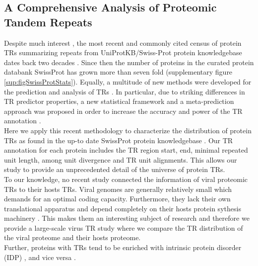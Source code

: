 \documentclass[a4,center,fleqn]{NAR}
\begin{document}
\subsection{A Comprehensive Analysis of Proteomic Tandem Repeats}
Despite much interest \cite{DiDomenico2013}, the most recent and commonly cited census of protein TRs summarizing repeats from UniProtKB/Swiss-Prot protein knowledgebase \cite{UniProt2017} dates back two decades \cite{Marcotte1999}. Since then the number of proteins in the curated protein databank SwissProt has grown more than seven fold (supplementary figure \ref{sup:figSwissProtStats}).
Equally, a multitude of new methods were developed for the prediction and analysis of TRs \cite{Anisimova2015, Fertin2015, Dashnow2018}. In particular, due to striking differences in TR predictor properties, a new statistical framework and a meta-prediction approach was proposed in order to increase the accuracy and power of the TR annotation \cite{Anisimova2015, Schaper2015}.\\
Here we apply this recent methodology to characterize the distribution of protein TRs as found in the up-to date SwissProt protein knowledgebase \cite{Boutet2016, UniProt2017}. Our TR annotation for each protein includes the TR region start, end, minimal repeated unit length, among unit divergence and TR unit alignments. This allows our study to provide an unprecedented detail of the universe of protein TRs.\\
To our knowledge, no recent study connected the information of viral proteomic TRs to their hosts TRs. 
Viral genomes are generally relatively small which demands for an optimal coding capacity. 
Furthermore, they lack their own translational apparatus and depend completely on their hosts protein sythesis machinery \cite{Walsh2003, Stern2018}. This makes them an interesting subject of research and therefore we provide a large-scale virus TR study where we compare the TR distribution of the viral proteome and their hosts proteome.\\
Further, proteins with TRs tend to be enriched with intrinsic protein disorder (IDP) \cite{Jorda2010}, and vice versa \cite{Szalkowski2013}.
\end{document}
